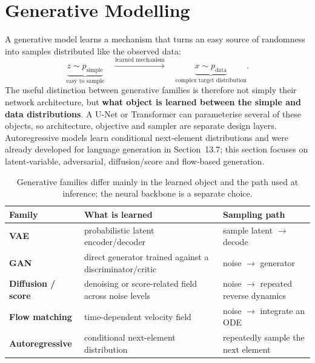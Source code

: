 
\chapter{Generative Modelling}
\label{chap:generative-modelling}

A generative model learns a mechanism that turns an easy source of randomness into samples distributed like the observed data:
\[
\underbrace{z\sim p_{\text{simple}}}_{\text{easy to sample}}
\quad\xrightarrow{\text{learned mechanism}}\quad
\underbrace{x\sim p_{\text{data}}}_{\text{complex target distribution}}.
\]
The useful distinction between generative families is therefore not simply their network architecture, but \textbf{what object is learned between the simple and data distributions}.
A U-Net or Transformer can parameterise several of these objects, so architecture, objective and sampler are separate design layers.
Autoregressive models learn conditional next-element distributions and were already developed for language generation in Section~13.7; this section focuses on latent-variable, adversarial, diffusion/score and flow-based generation.

\begin{table}[H]
\centering
\small
\begin{tabularx}{\linewidth}{>{\bfseries}l X X}
\toprule
Family & What is learned & Sampling path \\
\midrule
VAE & probabilistic latent encoder/decoder & sample latent $\rightarrow$ decode \\
GAN & direct generator trained against a discriminator/critic & noise $\rightarrow$ generator \\
Diffusion / score & denoising or score-related field across noise levels & noise $\rightarrow$ repeated reverse dynamics \\
Flow matching & time-dependent velocity field & noise $\rightarrow$ integrate an ODE \\
Autoregressive & conditional next-element distribution & repeatedly sample the next element \\
\bottomrule
\end{tabularx}
\caption{Generative families differ mainly in the learned object and the path used at inference; the neural backbone is a separate choice.}
\label{tab:generative-families}
\end{table}

